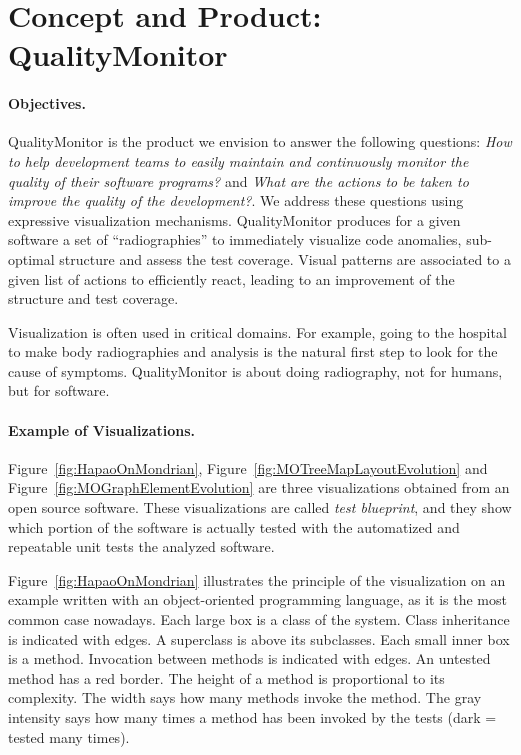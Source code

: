 \documentclass[runningheads]{llncs}
\newcommand{\figref}[1]{Figure~\ref{fig:#1}}
\begin{document}

\section{Concept and Product: QualityMonitor}

\paragraph{Objectives.}
QualityMonitor is the product we envision to answer the following questions: \emph{How to help development teams to easily maintain and continuously monitor the quality of their software programs?} and \emph{What are the actions to be taken to improve the quality of the development?}. We address these questions using expressive visualization mechanisms. QualityMonitor produces for a given software a set of  ``radiographies'' to immediately visualize code anomalies, sub-optimal structure and assess the test coverage. Visual patterns are associated to a given list of actions to efficiently react, leading to an improvement of the structure and test coverage. 

Visualization is often used in critical domains. For example, going to the hospital to make body radiographies and analysis is the natural first step to look for the cause of symptoms. QualityMonitor is about doing radiography, not for humans, but for software.

\paragraph{Example of Visualizations.}
\figref{HapaoOnMondrian}, \figref{MOTreeMapLayoutEvolution} and \figref{MOGraphElementEvolution} are three visualizations obtained from an open source software. These visualizations are called \emph{test blueprint}, and they show which portion of the software is actually tested with the automatized and repeatable unit tests the analyzed software. 

\figref{HapaoOnMondrian} illustrates the principle of the visualization on an example written with an object-oriented programming language, as it is the most common case nowadays. Each large box is a class of the system. Class inheritance is indicated with edges. A superclass is above its subclasses. Each small inner box is a method. Invocation between methods is indicated with edges. An untested method has a red border. The height of a method is proportional to its complexity. The width says how many methods invoke the method. The gray intensity says how many times a method has been invoked by the tests (dark = tested many times).
\end{document}
